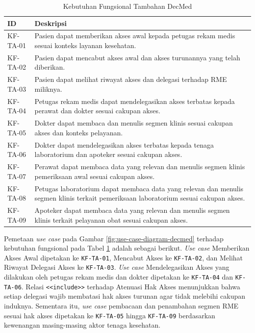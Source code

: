 \begin{table}[H]
	\centering
	\caption{Kebutuhan Fungsional Tambahan DecMed}
	\label{tab:kebutuhan-fungsional-tambahan-decmed}
	\begin{tabular}{|p{2cm}|p{10.5cm}|}
		\hline
		\textbf{ID} & \textbf{Deskripsi}                                                                                                                    \\
		\hline
		KF-TA-01    & Pasien dapat memberikan akses awal kepada petugas rekam medis sesuai konteks layanan kesehatan.                                       \\ \hline
		KF-TA-02    & Pasien dapat mencabut akses awal dan akses turunannya yang telah diberikan.                                                           \\ \hline
		KF-TA-03    & Pasien dapat melihat riwayat akses dan delegasi terhadap RME miliknya.                                                                \\ \hline
		KF-TA-04    & Petugas rekam medis dapat mendelegasikan akses terbatas kepada perawat dan dokter sesuai cakupan akses.                               \\ \hline
		KF-TA-05    & Dokter dapat membaca dan menulis segmen klinis sesuai cakupan akses dan konteks pelayanan.                                            \\ \hline
		KF-TA-06    & Dokter dapat mendelegasikan akses terbatas kepada tenaga laboratorium dan apoteker sesuai cakupan akses.                              \\ \hline
		KF-TA-07    & Perawat dapat membaca data yang relevan dan menulis segmen klinis pemeriksaan awal sesuai cakupan akses.                              \\ \hline
		KF-TA-08    & Petugas laboratorium dapat membaca data yang relevan dan menulis segmen klinis terkait pemeriksaan laboratorium sesuai cakupan akses. \\ \hline
		KF-TA-09    & Apoteker dapat membaca data yang relevan dan menulis segmen klinis terkait pelayanan obat sesuai cakupan akses.                       \\ \hline
	\end{tabular}
\end{table}
\FloatBarrier

Pemetaan \textit{use case} pada Gambar \ref{fig:use-case-diagram-decmed} terhadap kebutuhan fungsional pada Tabel \ref{tab:kebutuhan-fungsional-tambahan-decmed} adalah sebagai berikut. \textit{Use case} Memberikan Akses Awal dipetakan ke \texttt{KF-TA-01}, Mencabut Akses ke \texttt{KF-TA-02}, dan Melihat Riwayat Delegasi Akses ke \texttt{KF-TA-03}. \textit{Use case} Mendelegasikan Akses yang dilakukan oleh petugas rekam medis dan dokter dipetakan ke \texttt{KF-TA-04} dan \texttt{KF-TA-06}. Relasi \texttt{<<include>>} terhadap Atenuasi Hak Akses menunjukkan bahwa setiap delegasi wajib membatasi hak akses turunan agar tidak melebihi cakupan induknya. Sementara itu, \textit{use case} pembacaan dan penambahan segmen RME sesuai hak akses dipetakan ke \texttt{KF-TA-05} hingga \texttt{KF-TA-09} berdasarkan kewenangan masing-masing aktor tenaga kesehatan.

